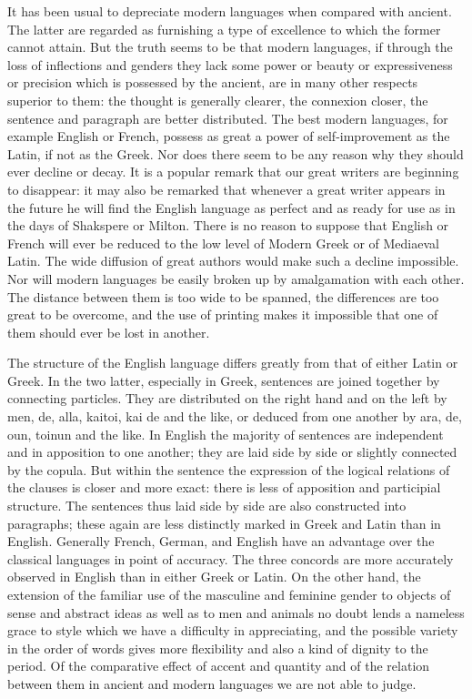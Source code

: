 \documentclass[11pt,letter]{article}
\begin{document}
\par  It has been usual to depreciate modern languages when compared with ancient. The latter are regarded as furnishing a type of excellence to which the former cannot attain. But the truth seems to be that modern languages, if through the loss of inflections and genders they lack some power or beauty or expressiveness or precision which is possessed by the ancient, are in many other respects superior to them: the thought is generally clearer, the connexion closer, the sentence and paragraph are better distributed. The best modern languages, for example English or French, possess as great a power of self-improvement as the Latin, if not as the Greek. Nor does there seem to be any reason why they should ever decline or decay. It is a popular remark that our great writers are beginning to disappear: it may also be remarked that whenever a great writer appears in the future he will find the English language as perfect and as ready for use as in the days of Shakspere or Milton. There is no reason to suppose that English or French will ever be reduced to the low level of Modern Greek or of Mediaeval Latin. The wide diffusion of great authors would make such a decline impossible. Nor will modern languages be easily broken up by amalgamation with each other. The distance between them is too wide to be spanned, the differences are too great to be overcome, and the use of printing makes it impossible that one of them should ever be lost in another.

\par  The structure of the English language differs greatly from that of either Latin or Greek. In the two latter, especially in Greek, sentences are joined together by connecting particles. They are distributed on the right hand and on the left by men, de, alla, kaitoi, kai de and the like, or deduced from one another by ara, de, oun, toinun and the like. In English the majority of sentences are independent and in apposition to one another; they are laid side by side or slightly connected by the copula. But within the sentence the expression of the logical relations of the clauses is closer and more exact: there is less of apposition and participial structure. The sentences thus laid side by side are also constructed into paragraphs; these again are less distinctly marked in Greek and Latin than in English. Generally French, German, and English have an advantage over the classical languages in point of accuracy. The three concords are more accurately observed in English than in either Greek or Latin. On the other hand, the extension of the familiar use of the masculine and feminine gender to objects of sense and abstract ideas as well as to men and animals no doubt lends a nameless grace to style which we have a difficulty in appreciating, and the possible variety in the order of words gives more flexibility and also a kind of dignity to the period. Of the comparative effect of accent and quantity and of the relation between them in ancient and modern languages we are not able to judge.
\end{document}
